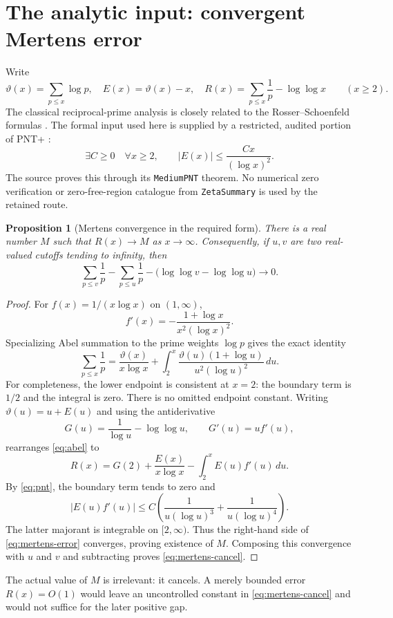 \documentclass[11pt,a4paper]{article}
\newtheorem{proposition}[theorem]{Proposition}
\theoremstyle{definition}
\theoremstyle{remark}
\numberwithin{equation}{section}
\begin{document}
\section{The analytic input: convergent Mertens error}\label{sec:analytic}
Write
\[
 \vartheta(x)=\sum_{p\le x}\log p,\quad
 E(x)=\vartheta(x)-x,\quad
 R(x)=\sum_{p\le x}\frac1p-\log\log x\qquad(x\ge2).
\]
The classical reciprocal-prime analysis is closely related to the
Rosser--Schoenfeld formulas \citep{RosserSchoenfeld1962}. The formal input used
here is supplied by a restricted, audited portion of PNT+
\citep{PNTPlus,SieveArtifact}:
\begin{equation}\label{eq:pnt}
 \exists C\ge0\quad\forall x\ge2,\qquad
 |E(x)|\le\frac{Cx}{(\log x)^2}.
\end{equation}
The source proves this through its \texttt{MediumPNT} theorem. No numerical
zero verification or zero-free-region catalogue from \texttt{ZetaSummary} is
used by the retained route.

\begin{proposition}[Mertens convergence in the required form]\label{prop:mertens}
There is a real number $M$ such that $R(x)\to M$ as $x\to\infty$.
Consequently, if $u,v$ are two real-valued cutoffs tending to infinity, then
\begin{equation}\label{eq:mertens-cancel}
 \sum_{p\le v}\frac1p-\sum_{p\le u}\frac1p
 -\bigl(\log\log v-\log\log u\bigr)\longrightarrow0.
\end{equation}
\end{proposition}
\begin{proof}
For $f(x)=1/(x\log x)$ on $(1,\infty)$,
\[
 f'(x)=-\frac{1+\log x}{x^2(\log x)^2}.
\]
Specializing Abel summation to the prime weights $\log p$ gives the exact
identity
\begin{equation}\label{eq:abel}
 \sum_{p\le x}\frac1p
 =\frac{\vartheta(x)}{x\log x}
   +\int_2^x\frac{\vartheta(u)(1+\log u)}{u^2(\log u)^2}\,du.
\end{equation}
For completeness, the lower endpoint is consistent at $x=2$: the boundary
term is $1/2$ and the integral is zero. There is no omitted endpoint constant.
Writing $\vartheta(u)=u+E(u)$ and using the antiderivative
\[
 G(u)=\frac1{\log u}-\log\log u,\qquad G'(u)=u f'(u),
\]
rearranges \eqref{eq:abel} to
\begin{equation}\label{eq:mertens-error}
 R(x)=G(2)+\frac{E(x)}{x\log x}-\int_2^x E(u)f'(u)\,du.
\end{equation}
By \eqref{eq:pnt}, the boundary term tends to zero and
\[
 |E(u)f'(u)|\le C\left(\frac1{u(\log u)^3}
                         +\frac1{u(\log u)^4}\right).
\]
The latter majorant is integrable on $[2,\infty)$. Thus the right-hand side of
\eqref{eq:mertens-error} converges, proving existence of $M$.
Composing this convergence with $u$ and $v$ and subtracting proves
\eqref{eq:mertens-cancel}.
\end{proof}
The actual value of $M$ is irrelevant: it cancels. A merely bounded error
$R(x)=O(1)$ would leave an uncontrolled constant in \eqref{eq:mertens-cancel}
and would not suffice for the later positive gap.
\end{document}
